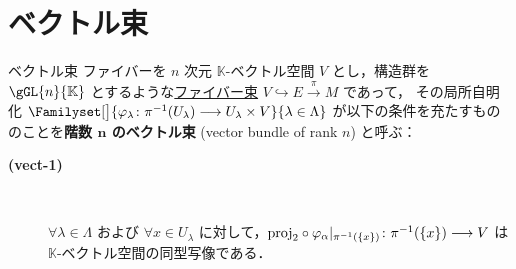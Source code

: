 \documentclass[geometry_main]{subfiles}
\begin{document}
\section{ベクトル束}

\begin{mydef}[label=def:vect]{ベクトル束}
    ファイバーを $n$ 次元 $\mathbb{K}$-ベクトル空間 $V$ とし，構造群を $\gGL{n}{\mathbb{K}}$ とするような\hyperref[def.fiber-1]{ファイバー束} $V \hookrightarrow E \xrightarrow{\pi} M$ であって，
    その局所自明化 $\Familyset[\big]{\varphi_\lambda \colon \pi^{-1}(U_\lambda) \lto U_\lambda \times V}{\lambda \in \Lambda}$ が以下の条件を充たすもののことを\textbf{階数 $\bm{n}$ のベクトル束} (vector bundle of rank $n$) と呼ぶ：
    \begin{description}
        \item[\textbf{(vect-1)}]　
        
        $\forall \lambda \in \Lambda$ および $\forall x \in U_\lambda$ に対して，$\mathrm{proj}_2 \circ \varphi_\alpha|_{\pi^{-1}(\{x\})} \colon \pi^{-1}(\{x\}) \longrightarrow V$ は $\mathbb{K}$-ベクトル空間の同型写像である．
    \end{description}
    
\end{mydef}


\end{document}
